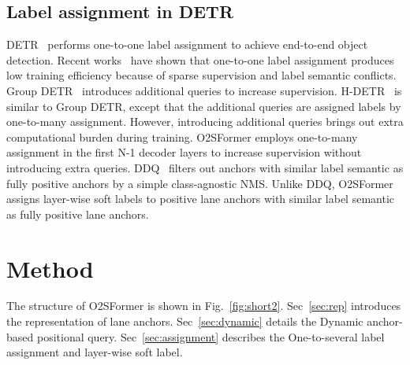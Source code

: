 \documentclass{bmvc2k}
\begin{document}
\subsection{Label assignment in DETR}
DETR~\cite{carion2020end} performs one-to-one label assignment to achieve end-to-end object detection. 
Recent works~\cite{chen2022group,jia2022detrs,zhang2023dense} have shown that one-to-one label assignment produces low training efficiency because of sparse supervision and label semantic conflicts.
Group DETR~\cite{chen2022group} introduces additional queries to increase 
supervision. H-DETR~\cite{jia2022detrs} is similar to Group DETR, except that the additional queries are 
assigned labels by one-to-many assignment. However, introducing additional queries brings out 
extra computational burden during training. O2SFormer employs one-to-many assignment in the first N-1 decoder layers to increase supervision without introducing extra queries.
DDQ~\cite{zhang2023dense} filters out anchors with similar label semantic as fully positive anchors by a simple class-agnostic NMS. Unlike DDQ, 
O2SFormer assigns layer-wise soft labels to positive lane anchors with similar label semantic as fully positive lane anchors.
\vspace{-0.2cm}

\section{Method}
\vspace{-0.2cm}
\label{sec:method}
The structure of O2SFormer is shown in Fig.~\ref{fig:short2}. Sec~\ref{sec:rep} introduces the representation of lane anchors. 
Sec~\ref{sec:dynamic} details the Dynamic anchor-based positional query. Sec~\ref{sec:assignment} describes the One-to-several label assignment and layer-wise soft label.
\vspace{-0.4cm}
\end{document}
